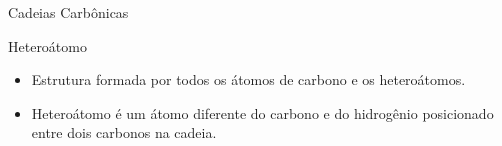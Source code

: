 \documentclass[presentation,professionalfonts,smaller,aspectratio=169]{beamer}
\begin{document}
\begin{frame}[label={sec:org3426f02}]{Cadeias Carbônicas}
\begin{myrule}{Heteroátomo}

\begin{itemize}
\item Estrutura formada por todos os átomos de carbono e os heteroátomos.
\item Heteroátomo é um átomo diferente do carbono e do hidrogênio  posicionado
entre  dois  carbonos  na cadeia.
\end{itemize}


\vspace{.5cm}

\end{myrule}
\end{frame}
\end{document}
